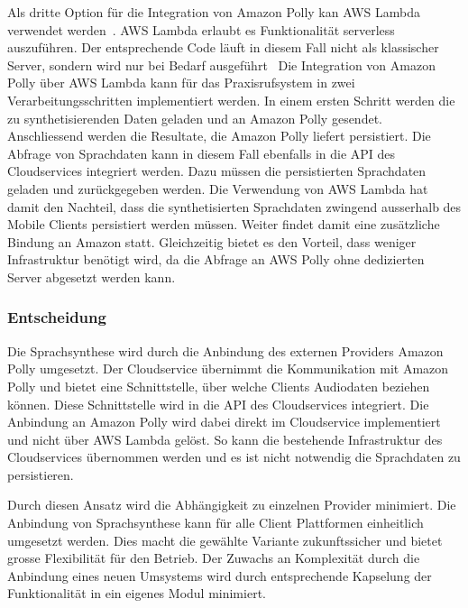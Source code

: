 Als dritte Option für die Integration von Amazon Polly kan AWS Lambda verwendet werden~\cite{aws_polly}.
AWS Lambda erlaubt es Funktionalität serverless auszuführen.
Der entsprechende Code läuft in diesem Fall nicht als klassischer Server, sondern wird nur bei Bedarf ausgeführt~\cite{aws_lambda}
Die Integration von Amazon Polly über AWS Lambda kann für das Praxisrufsystem in zwei Verarbeitungsschritten implementiert werden.
In einem ersten Schritt werden die zu synthetisierenden Daten geladen und an Amazon Polly gesendet.
Anschliessend werden die Resultate, die Amazon Polly liefert persistiert.
Die Abfrage von Sprachdaten kann in diesem Fall ebenfalls in die API des Cloudservices integriert werden.
Dazu müssen die persistierten Sprachdaten geladen und zurückgegeben werden.
Die Verwendung von AWS Lambda hat damit den Nachteil, dass die synthetisierten Sprachdaten zwingend ausserhalb des Mobile Clients persistiert werden müssen.
Weiter findet damit eine zusätzliche Bindung an Amazon statt.
Gleichzeitig bietet es den Vorteil, dass weniger Infrastruktur benötigt wird, da die Abfrage an AWS Polly ohne dedizierten Server abgesetzt werden kann.

\subsubsection{Entscheidung}

Die Sprachsynthese wird durch die Anbindung des externen Providers Amazon Polly umgesetzt.
Der Cloudservice übernimmt die Kommunikation mit Amazon Polly und bietet eine Schnittstelle, über welche Clients Audiodaten beziehen können.
Diese Schnittstelle wird in die API des Cloudservices integriert.
Die Anbindung an Amazon Polly wird dabei direkt im Cloudservice implementiert und nicht über AWS Lambda gelöst.
So kann die bestehende Infrastruktur des Cloudservices übernommen werden und es ist nicht notwendig die Sprachdaten zu persistieren.

Durch diesen Ansatz wird die Abhängigkeit zu einzelnen Provider minimiert.
Die Anbindung von Sprachsynthese kann für alle Client Plattformen einheitlich umgesetzt werden.
Dies macht die gewählte Variante zukunftssicher und bietet grosse Flexibilität für den Betrieb.
Der Zuwachs an Komplexität durch die Anbindung eines neuen Umsystems wird durch entsprechende Kapselung der Funktionalität in ein eigenes Modul minimiert.

\clearpage

